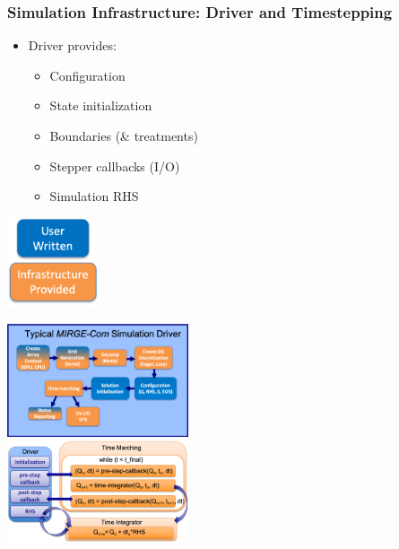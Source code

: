 \begin{frame}\frametitle{Simulation Infrastructure: Driver and Timestepping}
  \begin{multicols}{2}
    \begin{itemize}
    \item Driver provides:
      \begin{itemize}
      \item Configuration
      \item State initialization
      \item Boundaries (\& treatments)
      \item Stepper callbacks (I/O)
      \item Simulation RHS
      \end{itemize}
    \end{itemize}
    \vspace{30pt}
    \begin{center}
      \includegraphics[width=0.2\textwidth]{figures/mtc2/TypicalDriverKeyOrange.png}
    \end{center}
    \columnbreak
    \includegraphics[width=0.4\textwidth]{figures/mtc2/TypicalDriverOrange.png}\\
    \includegraphics[width=0.4\textwidth]{figures/mtc2/TimesteppingAndDriver.png}
  \end{multicols}
\end{frame}


